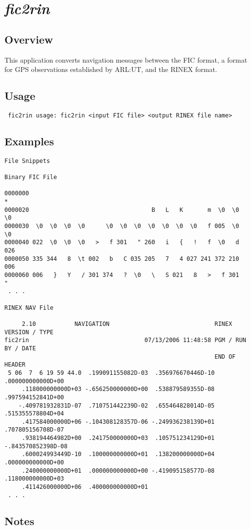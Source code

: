 %
%

\section{\emph{fic2rin}}
\subsection{Overview}
This application converts navigation messages between the FIC format, a format for GPS observations established by ARL:UT, and
the RINEX format.

\subsection{Usage}
\begin{\outputsize}
\begin{verbatim}
 fic2rin usage: fic2rin <input FIC file> <output RINEX file name>
\end{verbatim}
\end{\outputsize}

\subsection{Examples}

\begin{\outputsize}
\begin{verbatim}
File Snippets

Binary FIC File

0000000
*
0000020                                   B   L   K       m  \0  \0  \0
0000030  \0  \0  \0  \0      \0  \0  \0  \0  \0  \0  \0   f 005  \0  \0
0000040 022  \0  \0  \0   >   f 301   " 260   i   {   !   f  \0   d 026
0000050 335 344   8  \t 002   b   C 035 205   7   4 027 241 372 210 006
0000060 006   }   Y   / 301 374   ?  \0   \   S 021   8   >   f 301   "
 . . .

RINEX NAV File

     2.10           NAVIGATION                              RINEX VERSION / TYPE
fic2rin                                 07/13/2006 11:48:58 PGM / RUN BY / DATE
                                                            END OF HEADER
 5 06  7  6 19 59 44.0  .199091155082D-03  .356976670446D-10  .000000000000D+00
     .118000000000D+03 -.656250000000D+00  .538879589355D-08  .997594152841D+00
    -.409781932831D-07  .710751442239D-02  .655464828014D-05  .515355578804D+04
     .417584000000D+06 -.104308128357D-06 -.249936238139D+01  .707805156708D-07
     .938194464982D+00  .241750000000D+03  .105751234129D+01 -.843570852398D-08
     .600024993449D-10  .100000000000D+01  .138200000000D+04  .000000000000D+00
     .240000000000D+01  .000000000000D+00 -.419095158577D-08  .118000000000D+03
     .411426000000D+06  .400000000000D+01
 . . .

\end{verbatim}
\end{\outputsize}

\subsection{Notes}

%


